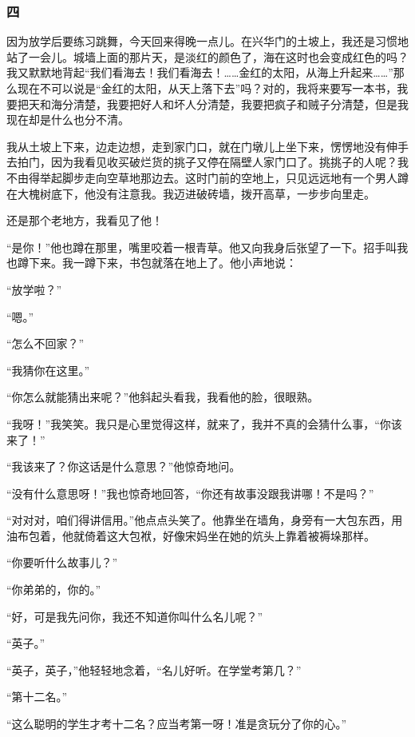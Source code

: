 \subsubsection*{四}

\par 因为放学后要练习跳舞，今天回来得晚一点儿。在兴华门的土坡上，我还是习惯地站了一会儿。城墙上面的那片天，是淡红的颜色了，海在这时也会变成红色的吗？我又默默地背起“我们看海去！我们看海去！……金红的太阳，从海上升起来……”那么现在不可以说是“金红的太阳，从天上落下去”吗？对的，我将来要写一本书，我要把天和海分清楚，我要把好人和坏人分清楚，我要把疯子和贼子分清楚，但是我现在却是什么也分不清。
\par 我从土坡上下来，边走边想，走到家门口，就在门墩儿上坐下来，愣愣地没有伸手去拍门，因为我看见收买破烂货的挑子又停在隔壁人家门口了。挑挑子的人呢？我不由得举起脚步走向空草地那边去。这时门前的空地上，只见远远地有一个男人蹲在大槐树底下，他没有注意我。我迈进破砖墙，拨开高草，一步步向里走。
\par 还是那个老地方，我看见了他！
\par “是你！”他也蹲在那里，嘴里咬着一根青草。他又向我身后张望了一下。招手叫我也蹲下来。我一蹲下来，书包就落在地上了。他小声地说：
\par “放学啦？”
\par “嗯。”
\par “怎么不回家？”
\par “我猜你在这里。”
\par “你怎么就能猜出来呢？”他斜起头看我，我看他的脸，很眼熟。
\par “我呀！”我笑笑。我只是心里觉得这样，就来了，我并不真的会猜什么事，“你该来了！”
\par “我该来了？你这话是什么意思？”他惊奇地问。
\par “没有什么意思呀！”我也惊奇地回答，“你还有故事没跟我讲哪！不是吗？”
\par “对对对，咱们得讲信用。”他点点头笑了。他靠坐在墙角，身旁有一大包东西，用油布包着，他就倚着这大包袱，好像宋妈坐在她的炕头上靠着被褥垛那样。
\par “你要听什么故事儿？”
\par “你弟弟的，你的。”
\par “好，可是我先问你，我还不知道你叫什么名儿呢？”
\par “英子。”
\par “英子，英子，”他轻轻地念着，“名儿好听。在学堂考第几？”
\par “第十二名。”
\par “这么聪明的学生才考十二名？应当考第一呀！准是贪玩分了你的心。”
